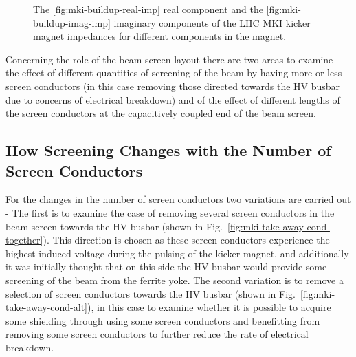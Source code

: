 \begin{figure}
\caption{The \ref{fig:mki-buildup-real-imp} real component and the \ref{fig:mki-buildup-imag-imp} imaginary components of the LHC MKI kicker magnet impedances for different components in the magnet.}
\label{fig:mki-buildup-impedance}
\end{figure}


Concerning the role of the beam screen layout there are two areas to examine - the effect of different quantities of screening of the beam by having more or less screen conductors (in this case removing those directed towards the HV busbar due to concerns of electrical breakdown) and of the effect of different lengths of the screen conductors at the capacitively coupled end of the beam screen.

\subsection{How Screening Changes with the Number of Screen Conductors}

For the changes in the number of screen conductors two variations are carried out - The first is to examine the case of removing several screen conductors in the beam screen towards the HV busbar (shown in Fig.~\ref{fig:mki-take-away-cond-together}). This direction is chosen as these screen conductors experience the highest induced voltage during the pulsing of the kicker magnet, and additionally it was initially thought that on this side the HV busbar would provide some screening of the beam from the ferrite yoke. The second variation is to remove a selection of screen conductors towards the HV busbar (shown in Fig.~\ref{fig:mki-take-away-cond-alt}), in this case to examine whether it is possible to acquire some shielding through using some screen conductors and benefitting from removing some screen conductors to further reduce the rate of electrical breakdown.

